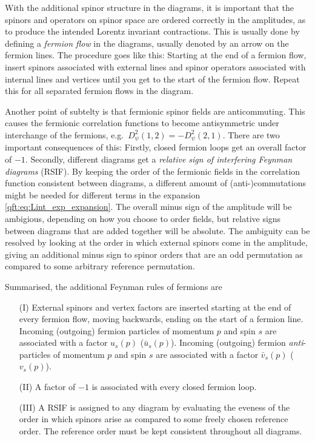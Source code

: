 \documentclass[../main.tex]{subfiles}
\begin{document}
With the additional spinor structure in the diagrams, it is important that the spinors and operators on spinor space are ordered correctly in the amplitudes, as to produce the intended Lorentz invariant contractions.
This is usually done by defining a \emph{fermion flow} in the diagrams, usually denoted by an arrow on the fermion lines.
The procedure goes like this:
Starting at the end of a fermion flow, insert spinors associated with external lines and spinor operators associated with internal lines and vertices until you get to the start of the fermion flow.
Repeat this for all separated fermion flows in the diagram.

Another point of subtelty is that fermionic spinor fields are anticommuting.
This causes the fermionic correlation functions to become antisymmetric under interchange of the fermions, e.g.\ \(D_\psi^2(1, 2) = -D_\psi^2(2, 1)\).
There are two important consequences of this:
Firstly, closed fermion loops get an overall factor of \(-1\).
Secondly, different diagrams get a \emph{relative sign of interfering Feynman diagrams} (RSIF).
By keeping the order of the fermionic fields in the correlation function consistent between diagrams, a different amount of (anti-)commutations might be needed for different terms in the expansion \cref{qft:eq:Lint_exp_expansion}.
The overall minus sign of the amplitude will be ambigious, depending on how you choose to order fields, but relative signs between diagrams that are added together will be absolute.
The ambiguity can be resolved by looking at the order in which external spinors come in the amplitude, giving an additional minus sign to spinor orders that are an odd permutation as compared to some arbitrary reference permutation.
\medskip

Summarised, the additional Feynman rules of fermions are
\begin{itemize}
  \item [(I)] External spinors and vertex factors are inserted starting at the end of every fermion flow, moving backwards, ending on the start of a fermion line. Incoming (outgoing) fermion particles of momentum \(p\) and spin \(s\) are associated with a factor \(u_s(p)\) (\(\bar{u}_s(p)\)). Incoming (outgoing) fermion \emph{anti}-particles of momentum \(p\) and spin \(s\) are associated with a factor \(\bar{v}_s(p)\) (\(v_s(p)\)).
  \item [(II)] A factor of \(-1\) is associated with every closed fermion loop.
  \item [(III)] A RSIF is assigned to any diagram by evaluating the eveness of the order in which spinors arise as compared to some freely chosen reference order. The reference order must be kept consistent throughout all diagrams.
\end{itemize}
\medskip
\end{document}
